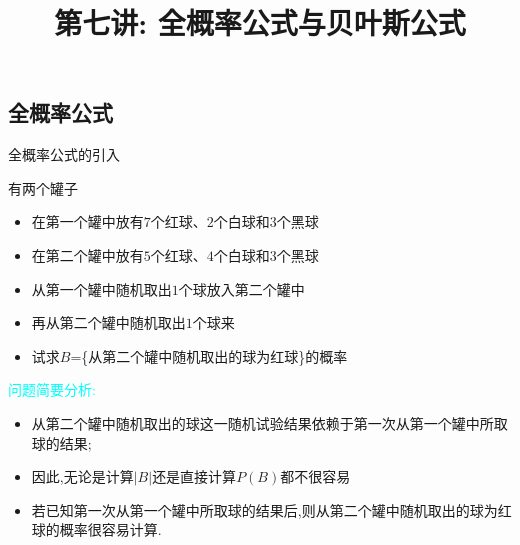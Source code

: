 

\title[概率论]{第七讲: 全概率公式与贝叶斯公式}
\date{}

{
	\begin{frame}
		\titlepage
	\end{frame}
}
\subsection{全概率公式}

\begin{frame}{全概率公式的引入}

	\begin{exam}
		有两个罐子
			\begin{itemize}[<+-|alert@+>]
			\item 在第一个罐中放有$7$个红球、$2$个白球和$3$个黑球
			\item 在第二个罐中放有$5$个红球、$4$个白球和$3$个黑球
			\item 从第一个罐中随机取出$1$个球放入第二个罐中
			\item 再从第二个罐中随机取出$1$个球来
			\item 试求$B$=\{从第二个罐中随机取出的球为红球\}的概率
		\end{itemize}
	\end{exam}
	\pause
	 \textcolor{cyan}{问题简要分析:}
	\begin{itemize}[<+-|alert@+>]
		\item 从第二个罐中随机取出的球这一随机试验结果依赖于第一次从第一个罐中所取球的结果;
		\item 因此,无论是计算$|B|$还是直接计算$P(B)$都不很容易
		\item 若已知第一次从第一个罐中所取球的结果后,则从第二个罐中随机取出的球为红球的概率很容易计算.
	\end{itemize}
\end{frame}

